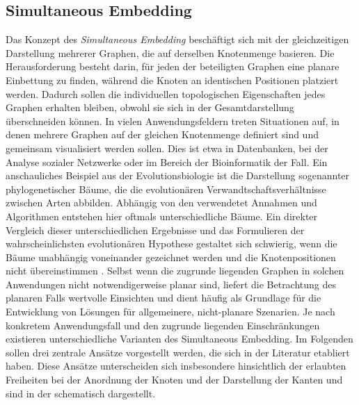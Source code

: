 \documentclass[bachelor, german]{algothesis}
\begin{document}
\subsection{Simultaneous Embedding}
Das Konzept des \emph{Simultaneous Embedding} beschäftigt sich mit der gleichzeitigen Darstellung mehrerer Graphen, die auf derselben Knotenmenge basieren. Die Herausforderung besteht darin, für jeden der beteiligten Graphen eine planare Einbettung zu finden, während die Knoten an identischen Positionen platziert werden. Dadurch sollen die individuellen topologischen Eigenschaften jedes Graphen erhalten bleiben, obwohl sie sich in der Gesamtdarstellung überschneiden können.\newline
In vielen Anwendungsfeldern treten Situationen auf, in denen mehrere Graphen auf der gleichen Knotenmenge definiert sind und gemeinsam visualisiert werden sollen. Dies ist etwa in Datenbanken, bei der Analyse sozialer Netzwerke oder im Bereich der Bioinformatik der Fall. \newline
Ein anschauliches Beispiel aus der Evolutionsbiologie ist die Darstellung sogenannter phylogenetischer Bäume, die die evolutionären Verwandtschaftsverhältnisse zwischen Arten abbilden. Abhängig von den verwendetet Annahmen und Algorithmen entstehen hier oftmals unterschiedliche Bäume. Ein direkter Vergleich dieser unterschiedlichen Ergebnisse und das Formulieren der wahrscheinlichsten evolutionären Hypothese gestaltet sich schwierig, wenn die Bäume unabhängig voneinander gezeichnet werden und die Knotenpositionen nicht übereinstimmen \cite{Handbook}. \newline
Selbst wenn die zugrunde liegenden Graphen in solchen Anwendungen nicht notwendigerweise planar sind, liefert die Betrachtung des planaren Falls wertvolle Einsichten und dient häufig als Grundlage für die Entwicklung von Lösungen für allgemeinere, nicht-planare Szenarien.\newline
Je nach konkretem Anwendungsfall und den zugrunde liegenden Einschränkungen existieren unterschiedliche Varianten des Simultaneous Embedding. Im Folgenden sollen drei zentrale Ansätze vorgestellt werden, die sich in der Literatur etabliert haben. Diese Ansätze unterscheiden sich insbesondere hinsichtlich der erlaubten Freiheiten bei der Anordnung der Knoten und der Darstellung der Kanten und sind in der  schematisch dargestellt.
\end{document}
